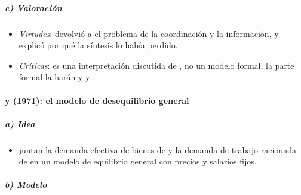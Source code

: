 \documentclass[11pt]{article}
\begin{document}
\subparagraph{c) Valoración}

\begin{itemize}
\item \emph{Virtudes}: devolvió a  el problema de la coordinación y la información, y explicó por qué la síntesis lo había perdido.
\item \emph{Críticas}: es una interpretación discutida de , no un modelo formal; la parte formal la harán  y  y .
\end{itemize}

\paragraph{ y  (1971): el modelo de desequilibrio general}

\subparagraph{a) Idea}

\begin{itemize}
\item \textcite{BarroGrossman1971General} juntan la demanda efectiva de bienes de  y la demanda de trabajo racionada de  en un modelo de equilibrio general con precios y salarios fijos.
\end{itemize}

\subparagraph{b) Modelo}
\end{document}
